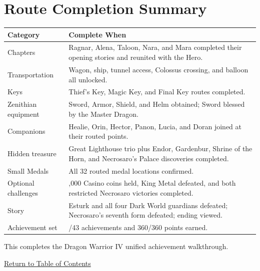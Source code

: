 \documentclass[
  american,
  10pt,
  letterpaper,
  oneside,
  open=any]{scrreprt}
\newcounter{none} %
\newenvironment{guidetable}{%
  \small\setstretch{1.0}%
  \setlength{\tabcolsep}{4pt}%
  \setlength{\LTpre}{8pt}\setlength{\LTpost}{10pt}%
  \renewcommand{\arraystretch}{1.16}%
}{ }
\begin{document}
\section{Route Completion Summary}\label{route-completion-summary}

\begin{guidetable}

{\def\LTcaptype{none} %
\begin{longtable}[]{@{}
  >{\raggedright\arraybackslash}p{}
  >{\raggedright\arraybackslash}p{}@{}}
\toprule\noalign{}
\begin{minipage}[b]{\linewidth}\raggedright
\color{GuideGreen}\bfseries Category
\end{minipage} & \begin{minipage}[b]{\linewidth}\raggedright
\color{GuideGreen}\bfseries Complete When
\end{minipage} \\
\midrule\noalign{}
\endhead
\bottomrule\noalign{}
\endlastfoot
Chapters & Ragnar, Alena, Taloon, Nara, and Mara completed their opening
stories and reunited with the Hero. \\
Transportation & Wagon, ship, tunnel access, Colossus crossing, and
balloon all unlocked. \\
Keys & Thief's Key, Magic Key, and Final Key routes completed. \\
Zenithian equipment & Sword, Armor, Shield, and Helm obtained; Sword
blessed by the Master Dragon. \\
Companions & Healie, Orin, Hector, Panon, Lucia, and Doran joined at
their routed points. \\
Hidden treasure & Great Lighthouse trio plus Endor, Gardenbur, Shrine of
the Horn, and Necrosaro's Palace discoveries completed. \\
Small Medals & All 32 routed medal locations confirmed. \\
Optional challenges & 10,000 Casino coins held, King Metal defeated, and
both restricted Necrosaro victories completed. \\
Story & Esturk and all four Dark World guardians defeated; Necrosaro's
seventh form defeated; ending viewed. \\
Achievement set & 43/43 achievements and 360/360 points earned. \\
\end{longtable}
}

\end{guidetable}

This completes the Dragon Warrior IV unified achievement walkthrough.

\hyperref[table-of-contents]{Return to Table of Contents}
\end{document}
